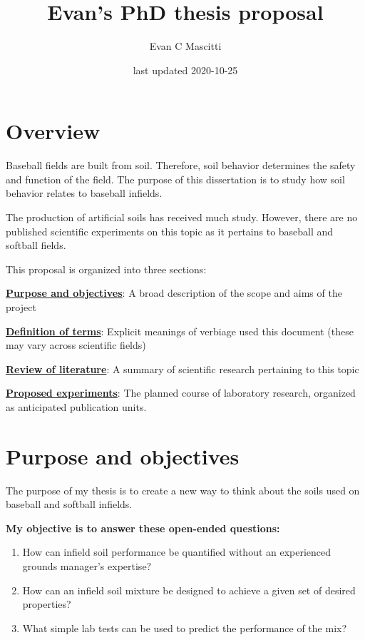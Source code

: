 \documentclass[
]{book}
\title{Evan's PhD thesis proposal}
\author{Evan C Mascitti}
\date{last updated 2020-10-25}
\providecommand{\tightlist}{%
  \setlength{\itemsep}{0pt}\setlength{\parskip}{0pt}}
\begin{document}
\maketitle

{
\setcounter{tocdepth}{1}
\tableofcontents
}
\hypertarget{overview}{%
\chapter{Overview}\label{overview}}

Baseball fields are built from soil. Therefore, soil behavior determines the safety and function of the field. The purpose of this dissertation is to study how soil behavior relates to baseball infields.

The production of artificial soils has received much study. However, there are
no published scientific experiments on this topic as it pertains to baseball and
softball fields.

This proposal is organized into three sections:

\protect\hyperlink{purpose-objectives}{\textbf{Purpose and objectives}}: A broad description of the scope and aims of the project

\protect\hyperlink{definition-of-terms}{\textbf{Definition of terms}}: Explicit meanings of verbiage used this document (these may vary across scientific fields)

\protect\hyperlink{lit-review}{\textbf{Review of literature}}: A summary of scientific research pertaining to this topic

\protect\hyperlink{proposed-experiments}{\textbf{Proposed experiments}}: The planned course of laboratory research, organized as anticipated publication units.

\hypertarget{purpose-objectives}{%
\chapter{Purpose and objectives}\label{purpose-objectives}}

The purpose of my thesis is to create a new way to think about the soils used on baseball and softball infields.

\textbf{My objective is to answer these open-ended questions:}

\begin{enumerate}
\def\labelenumi{\arabic{enumi}.}
\tightlist
\item
  How can infield soil performance be quantified without an experienced grounds manager's expertise?
\item
  How can an infield soil mixture be designed to achieve a given set of desired properties?
\item
  What simple lab tests can be used to predict the performance of the mix?
\end{enumerate}
\end{document}
